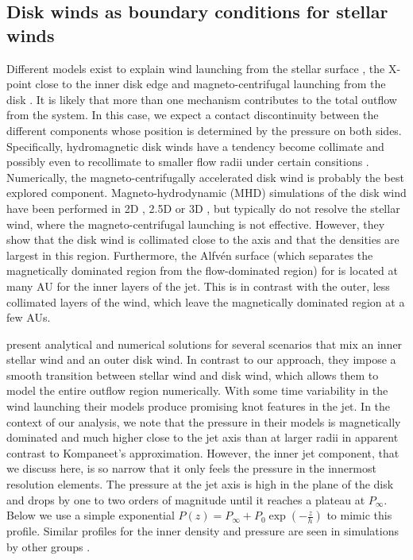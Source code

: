 \subsection{Disk winds as boundary conditions for stellar winds}
\label{sect:boundary}
Different models exist to explain wind launching from the stellar surface \citep{1988ApJ...332L..41K,2005ApJ...632L.135M}, the X-point close to the inner disk edge \citep{1994ApJ...429..781S} and magneto-centrifugal launching from the disk \citep{1982MNRAS.199..883B,2005ApJ...630..945A}. It is likely that more than one mechanism contributes to the total outflow from the system. In this case, we expect a contact discontinuity between the different components whose position is determined by the pressure on both sides. Specifically, hydromagnetic disk winds have a tendency become collimate and possibly even to recollimate to smaller flow radii under certain consitions \citep{1982MNRAS.199..883B,1992ApJ...394..117P}.
Numerically, the magneto-centrifugally accelerated disk wind is probably the best explored component. Magneto-hydrodynamic (MHD) simulations of the disk wind have been performed in 2D \citep[e.g.][]{2005ApJ...630..945A}, 2.5D \citep[e.g.][]{2011ApJ...728L..11R} or 3D \citep[e.g.][]{2006ApJ...653L..33A}, but typically do not resolve the stellar wind, where the magneto-centrifugal launching is not effective. However, they show that the disk wind is collimated close to the axis and that the densities are largest in this region. Furthermore, the Alfv\'en surface (which separates the magnetically dominated region from the flow-dominated region) for is located at many AU for the inner layers of the jet. This is in contrast with the outer, less collimated layers of the wind, which leave the magnetically dominated region at a few AUs.

\citet{2009A&A...502..217M} present analytical and numerical solutions for several scenarios that mix an inner stellar wind and an outer disk wind. In contrast to our approach, they impose a smooth transition between stellar wind and disk wind, which allows them to model the entire outflow region numerically. With some time variability in the wind launching their models produce promising knot features in the jet. In the context of our analysis, we note that the pressure in their models is magnetically dominated and much higher close to the jet axis than at larger radii in apparent contrast to Kompaneet's approximation. However, the inner jet component, that we discuss here, is so narrow that it only feels the pressure in the innermost resolution elements. The pressure at the jet axis is high in the plane of the disk and drops by one to two orders of magnitude until it reaches a plateau at $P_\infty$. Below we use a simple exponential $P(z)=P_\infty+P_0\exp\left(-\frac{z}{h}\right)$ to mimic this profile.
Similar profiles for the inner density and pressure are seen in simulations by other groups \citep[e.g.][]{2005ApJ...630..945A,Li_Krasnopolsky_Blandford_2006,2008ApJ...678.1109M}.

